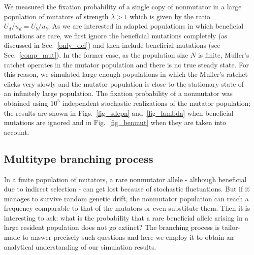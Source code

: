 \documentclass[preprint,12pt,number]{elsarticle}
\begin{document}
We measured the fixation probability of a single copy of nonmutator in a large population of mutators of strength $\lambda > 1$ which is given by the ratio $U_d/u_d=U_b/u_b$. As we are interested in adapted populations in which beneficial mutations are rare, we first ignore the beneficial mutations completely (as discussed in Sec.~\ref{only_del}) and then include beneficial mutations (see Sec.~\ref{comp_mut}). In the former case, as the population size $N$ is finite, Muller's ratchet \citep{Haigh:1978} operates in the mutator population  and there is no true steady state. For this reason, we simulated large enough populations in which the Muller's ratchet clicks very slowly \citep{Jain:2008b} and the mutator population is close to the stationary state of an infinitely large population.   
The fixation probability of a nonmutator was obtained using $10^5$ independent stochastic realizations of the mutator population; the results are shown in Figs.~\ref{fig_sdepn} and~\ref{fig_lambda} when beneficial mutations are ignored and in Fig.~\ref{fig_benmut} when they are taken into account.  
 
\subsection{Multitype branching process}
\label{analys}

In a finite population of mutators, a rare nonmutator allele - although beneficial due to indirect selection - can get lost because of stochastic fluctuations. But if it manages to survive random genetic drift, the nonmutator population can reach a frequency comparable to that of the mutators or even substitute them. Then it is interesting to ask: what is the probability that a rare beneficial allele arising in a large resident population does not go extinct? The branching process \citep{Harris:1963,Patwa:2008} is tailor-made to answer precisely such questions and here we employ it to obtain an analytical understanding of our  simulation results. 
 
\end{document}

